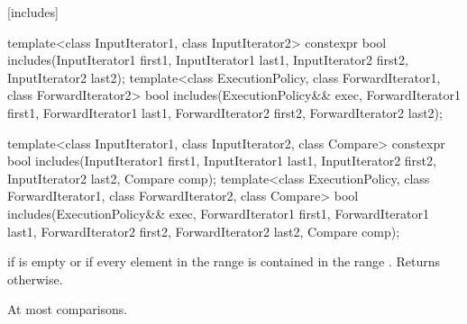 [includes]{}

%
\begin{itemdecl}
template<class InputIterator1, class InputIterator2>
  constexpr bool includes(InputIterator1 first1, InputIterator1 last1,
                          InputIterator2 first2, InputIterator2 last2);
template<class ExecutionPolicy, class ForwardIterator1, class ForwardIterator2>
  bool includes(ExecutionPolicy&& exec,
                ForwardIterator1 first1, ForwardIterator1 last1,
                ForwardIterator2 first2, ForwardIterator2 last2);

template<class InputIterator1, class InputIterator2, class Compare>
  constexpr bool includes(InputIterator1 first1, InputIterator1 last1,
                          InputIterator2 first2, InputIterator2 last2,
                          Compare comp);
template<class ExecutionPolicy, class ForwardIterator1, class ForwardIterator2, class Compare>
  bool includes(ExecutionPolicy&& exec,
                ForwardIterator1 first1, ForwardIterator1 last1,
                ForwardIterator2 first2, ForwardIterator2 last2,
                Compare comp);
\end{itemdecl}

\begin{itemdescr}
\pnum
\returns
{}
if  is empty or
if every element in the range
is contained in the range
.
Returns
otherwise.

\pnum
\complexity
At most
comparisons.
\end{itemdescr}

